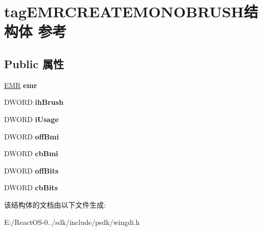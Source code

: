 \hypertarget{structtag_e_m_r_c_r_e_a_t_e_m_o_n_o_b_r_u_s_h}{}\section{tag\+E\+M\+R\+C\+R\+E\+A\+T\+E\+M\+O\+N\+O\+B\+R\+U\+S\+H结构体 参考}
\label{structtag_e_m_r_c_r_e_a_t_e_m_o_n_o_b_r_u_s_h}
\subsection*{Public 属性}
\begin{DoxyCompactItemize}
\item 
\mbox{\label{structtag_e_m_r_c_r_e_a_t_e_m_o_n_o_b_r_u_s_h_aa6d3d3eb50e9f4193c8d46416140cbcc}} 
\hyperlink{structtag_e_m_r}{E\+MR} {\bfseries emr}
\item 
\mbox{\label{structtag_e_m_r_c_r_e_a_t_e_m_o_n_o_b_r_u_s_h_ab21b893e47467aafac3ef2cb34951d8a}} 
D\+W\+O\+RD {\bfseries ih\+Brush}
\item 
\mbox{\label{structtag_e_m_r_c_r_e_a_t_e_m_o_n_o_b_r_u_s_h_a319ede25751864752522e9bc5d5f3395}} 
D\+W\+O\+RD {\bfseries i\+Usage}
\item 
\mbox{\label{structtag_e_m_r_c_r_e_a_t_e_m_o_n_o_b_r_u_s_h_a801398d6c29deea75ca7d4d0abaca724}} 
D\+W\+O\+RD {\bfseries off\+Bmi}
\item 
\mbox{\label{structtag_e_m_r_c_r_e_a_t_e_m_o_n_o_b_r_u_s_h_a5f0eb32ddf3e4081c21135c2361de34e}} 
D\+W\+O\+RD {\bfseries cb\+Bmi}
\item 
\mbox{\label{structtag_e_m_r_c_r_e_a_t_e_m_o_n_o_b_r_u_s_h_ab1818b48582a661c0dc8eb37e159e8bb}} 
D\+W\+O\+RD {\bfseries off\+Bits}
\item 
\mbox{\label{structtag_e_m_r_c_r_e_a_t_e_m_o_n_o_b_r_u_s_h_a9a7229f2b2b58a910618674f90c0425d}} 
D\+W\+O\+RD {\bfseries cb\+Bits}
\end{DoxyCompactItemize}


该结构体的文档由以下文件生成\+:\begin{DoxyCompactItemize}
\item 
E\+:/\+React\+O\+S-\/0../sdk/include/psdk/wingdi.\+h\end{DoxyCompactItemize}
